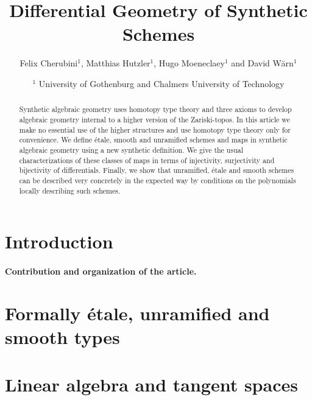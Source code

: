 \documentclass{../util/zariski}
\title{Differential Geometry of Synthetic Schemes}
\author{Felix Cherubini$^1$, Matthias Hutzler$^1$, Hugo Moeneclaey$^1$ and David Wärn$^1$}
\date{$^1$ University of Gothenburg and Chalmers University of Technology }
\begin{document}
\maketitle

\begin{abstract}
  Synthetic algebraic geometry uses homotopy type theory and three axioms to develop algebraic geometry internal to a higher version of the Zariski-topos.
  In this article we make no essential use of the higher structures and use homotopy type theory only for convenience.
  We define étale, smooth and unramified schemes and maps in synthetic algebraic geometry using a new synthetic definition.
  We give the usual characterizations of these classes of maps in terms of injectivity, surjectivity and bijectivity of differentials.
  Finally, we show that unramified, étale and smooth schemes can be described very concretely in the expected way by conditions on the polynomials locally describing such schemes.  
\end{abstract}







\tableofcontents

\section*{Introduction}

\paragraph{Contribution and organization of the article. }


\section{Formally étale, unramified and smooth types}


\section{Linear algebra and tangent spaces}

\end{document}
